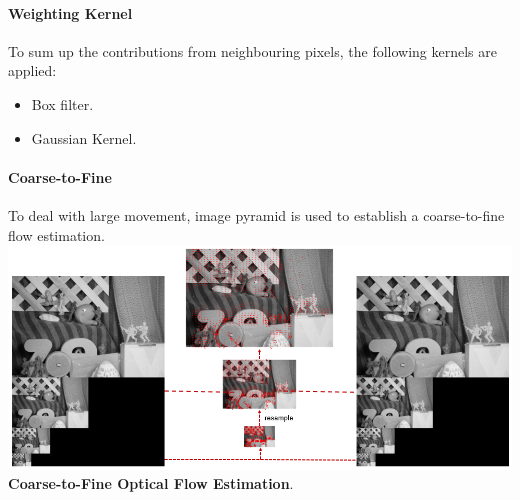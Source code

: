 \documentclass[landscape,a0paper,fontscale=0.292]{baposter}
\begin{document}
\begin{poster}
{\paragraph{Weighting Kernel} To sum up the contributions from neighbouring pixels, the following kernels are applied:
\begin{itemize}
\item Box filter.
\item Gaussian Kernel.
\end{itemize}
\paragraph{Coarse-to-Fine} To deal with large movement, image pyramid is used to establish a coarse-to-fine flow estimation.
\newline
\includegraphics[width=1\linewidth]{figures/final.png}%
\vspace{0.25em}
\textbf{Coarse-to-Fine Optical Flow Estimation}.
}
\end{poster}
\end{document}
